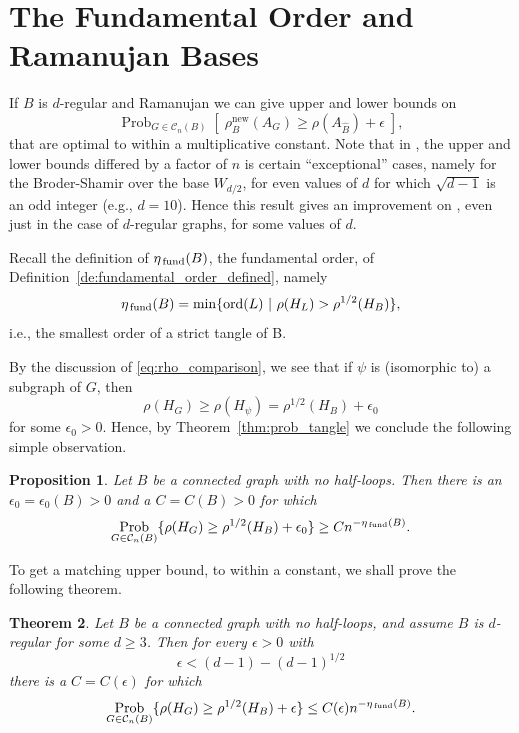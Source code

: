 \documentclass{memo-l}
\newcommand{\etafund}{{\eta_{\rm \,fund}}}
\theoremstyle{plain}
\newtheorem{theorem}{Theorem}[section]
\newtheorem{proposition}[theorem]{Proposition}
\theoremstyle{definition}
\newtheorem{definition}[theorem]{Definition}
\numberwithin{section}{chapter}
\numberwithin{equation}{chapter}
\newcommand{\prob}[2]{{\Prob}_{#1}{\left[\; #2\; \right]}}
\newcommand{\rhoroot}[1]{\rho^{1/2}(H_{#1})}
\DeclareMathOperator{\ord}{ord}
\DeclareMathOperator{\Prob}{Prob}
\newcommand{\rhonew}{\rho^{\mathrm{new}}}
\theoremstyle{plain}
\theoremstyle{definition}
\newcommand\cC{\mathcal{C}}
\begin{document}
\section{The Fundamental Order and Ramanujan Bases}
\label{se:p2-fund-exp}

If $B$ is $d$-regular and Ramanujan we can give upper and lower bounds on
$$
\prob{G\in \cC_n(B)}{\rhonew_B(A_G) \ge \rho(A_{\widehat B})+\epsilon},
$$
that are optimal to within a multiplicative constant.
Note that in \cite{friedman_alon}, the upper and lower bounds differed
by a factor of $n$ is certain ``exceptional'' cases, namely
for the Broder-Shamir over the base $W_{d/2}$, for even values of $d$
for which $\sqrt{d-1}$ is an odd integer (e.g., $d=10$).
Hence this result gives an improvement on \cite{friedman_alon}, even
just in the case of $d$-regular graphs, for some values of $d$.

Recall the definition of $\etafund(B)$, the 
\gls{fundamental order},
of Definition~\ref{de:fundamental_order_defined}, namely
$$
\etafund(B) = \min\{ \ord(L) \ |\ 
\rho(H_L) > \rhoroot B  \} ,
$$
i.e., the smallest order of a 
\gls{strict tangle of B}.

By the discussion of \eqref{eq:rho_comparison}, we see that
if $\psi$ is (isomorphic to) a subgraph of $G$, then
$$
\rho(H_G) \ge \rho(H_\psi) = \rhoroot B + \epsilon_0
$$
for some $\epsilon_0>0$.
Hence, by Theorem~\ref{thm:prob_tangle}
we conclude the following simple observation.

\begin{proposition} Let $B$ be a connected graph with no half-loops.
Then there is an $\epsilon_0=\epsilon_0(B)>0$ and a $C=C(B)>0$ for which
$$
\Prob_{G\in \cC_n(B)}\{ \rho(H_G) \ge \rhoroot B +\epsilon_0  \} 
\ge  C n^{-\etafund(B)} .
$$
\end{proposition}

To get a matching upper bound, to within a constant, we shall prove
the following theorem.

\begin{theorem} Let $B$ be a connected graph with no half-loops,
and assume $B$ is $d$-regular for some $d\ge 3$.
Then 
for every $\epsilon>0$ with 
$$
\epsilon<(d-1)-(d-1)^{1/2}
$$
there is a $C=C(\epsilon)$ for which
$$
\Prob_{G\in \cC_n(B)}\{ \rho(H_G) \ge \rhoroot B +\epsilon  \}
\le  C(\epsilon) n^{-\etafund(B)} .
$$
\end{theorem}
\end{document}
